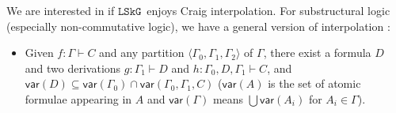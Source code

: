 \documentclass[submission,copyright,creativecommons]{eptcs}
\theoremstyle{definition}
\newcommand{\vdG}{\vdash}
\newcommand{\vdL}{\vdash_{L}}
\newcommand{\NL}{$\mathtt{NL}$}
\newcommand{\LSkNL}{$\mathtt{LSkNL}$}
\newcommand{\LSkG}{$\mathtt{LSkG}$}
\newcommand{\vars}[1]{\mathsf{var}(#1)}
\begin{document}

We are interested in if \LSkG~enjoys Craig interpolation.
For substructural logic (especially non-commutative logic), we have a general version of interpolation \cite{ono:proof:nonclassical:1998}:
\begin{itemize}
  \item[\ ] Given $f : \Gamma \vdash C$ and any partition $\langle \Gamma_0, \Gamma_1, \Gamma_2 \rangle$ of $\Gamma$, there exist a formula $D$ and two derivations $g : \Gamma_1 \vdash D$ and $h : \Gamma_0, D, \Gamma_1 \vdash C$, and $\vars{D} \subseteq \vars{\Gamma_0} \cap \vars{\Gamma_0, \Gamma_1, C}$ ($\vars{A}$ is the set of atomic formulae appearing in $A$ and $\vars{\Gamma}$ means $\bigcup \vars{A_i}$ for $A_i \in \Gamma$).
\end{itemize}
\end{document}
